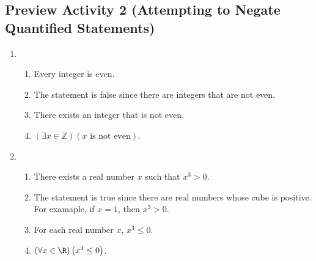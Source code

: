 \subsection*{Preview Activity 2 (Attempting to Negate Quantified Statements)}
\begin{enumerate}
\item \begin{enumerate}
  \item Every integer is even.
  \item The statement is false since there are integers that are not even.
  \item There exists an integer that is not even.
  \item $( {\exists x \in \mathbb{Z}} )( {x\text{ is not even}} )$.
\end{enumerate}

\item \begin{enumerate}
  \item There exists a real number $x$ such that $x^3 > 0$.
  \item The statement is true since there are real numbers whose cube is positive.  For examaple, if $x = 1$, then $x^3 > 0$.
  \item For each real number $x$, $x^3 \leq 0$.
  \item $\left( \forall x \in \R \right) \left( x^3 \leq 0 \right)$.
  \end{enumerate}
\end{enumerate}
\hbreak


\newpage

\endinput
